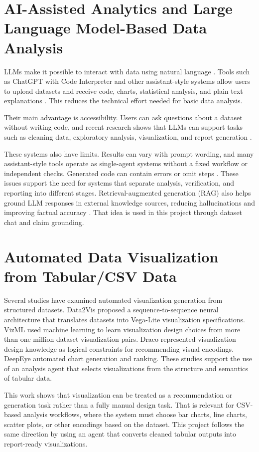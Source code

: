 \documentclass[12pt,a4paper,openany]{report}
\begin{document}
\section{AI-Assisted Analytics and Large Language Model-Based Data Analysis}
LLMs make it possible to interact with data using natural language \cite{dwivedi2023}. Tools such as ChatGPT with Code Interpreter and other assistant-style systems allow users to upload datasets and receive code, charts, statistical analysis, and plain text explanations \cite{openai2024}. This reduces the technical effort needed for basic data analysis.

Their main advantage is accessibility. Users can ask questions about a dataset without writing code, and recent research shows that LLMs can support tasks such as cleaning data, exploratory analysis, visualization, and report generation \cite{sun2024}.

These systems also have limits. Results can vary with prompt wording, and many assistant-style tools operate as single-agent systems without a fixed workflow or independent checks. Generated code can contain errors or omit steps \cite{liu2023chatgpt, maynez2020faithfulness}. These issues support the need for systems that separate analysis, verification, and reporting into different stages. Retrieval-augmented generation (RAG) also helps ground LLM responses in external knowledge sources, reducing hallucinations and improving factual accuracy \cite{lewis2020rag}. That idea is used in this project through dataset chat and claim grounding.

\section{Automated Data Visualization from Tabular/CSV Data}
Several studies have examined automated visualization generation from structured datasets. Data2Vis \cite{dibia2019} proposed a sequence-to-sequence neural architecture that translates datasets into Vega-Lite visualization specifications. VizML \cite{hu2019} used machine learning to learn visualization design choices from more than one million dataset-visualization pairs. Draco \cite{moritz2018} represented visualization design knowledge as logical constraints for recommending visual encodings. DeepEye \cite{luo2018} automated chart generation and ranking. These studies support the use of an analysis agent that selects visualizations from the structure and semantics of tabular data.

This work shows that visualization can be treated as a recommendation or generation task rather than a fully manual design task. That is relevant for CSV-based analysis workflows, where the system must choose bar charts, line charts, scatter plots, or other encodings based on the dataset. This project follows the same direction by using an agent that converts cleaned tabular outputs into report-ready visualizations.
\end{document}
